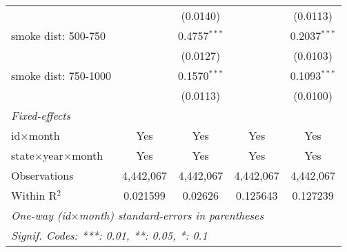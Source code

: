 \begin{table}[H]
\begin{tabular}{lcccc}
  &   & (0.0140) &    & (0.0113)\\
smoke dist: 500-750&   & 0.4757$^{***}$ &    & 0.2037$^{***}$\\
  &   & (0.0127) &    & (0.0103)\\
smoke dist: 750-1000&   & 0.1570$^{***}$ &    & 0.1093$^{***}$\\
  &   & (0.0113) &    & (0.0100)\\
\midrule \emph{Fixed-effects}&   &   &   &  \\
id$\times$month & Yes & Yes & Yes & Yes\\
state$\times$year$\times$month & Yes & Yes & Yes & Yes\\
\midrule
Observations & 4,442,067&4,442,067&4,442,067&4,442,067\\
Within R$^2$ & 0.021599&0.02626&0.125643&0.127239\\
\midrule\midrule\multicolumn{5}{l}{\emph{One-way (id$\times$month) standard-errors in parentheses}}\\
\multicolumn{5}{l}{\emph{Signif. Codes: ***: 0.01, **: 0.05, *: 0.1}}\\
\end{tabular}
\label{tab:plume_accuracy}
\end{table}
